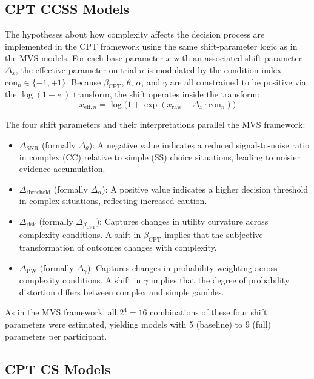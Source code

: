 \documentclass[man,floatsintext]{apa7}
\begin{document}
\subsection{CPT CCSS Models}

The hypotheses about how complexity affects the decision process are implemented in the CPT framework using the same shift-parameter logic as in the MVS models. For each base parameter $x$ with an associated shift parameter $\Delta_x$, the effective parameter on trial $n$ is modulated by the condition index $\text{con}_n \in \{-1, +1\}$. Because $\beta_{\text{CPT}}$, $\theta$, $\alpha$, and $\gamma$ are all constrained to be positive via the $\log(1 + e^{\cdot})$ transform, the shift operates inside the transform:
\begin{equation}
    x_{\text{eff},n} = \log\bigl(1 + \exp(x_{\text{raw}} + \Delta_x \cdot \text{con}_n)\bigr)
    \label{eq:cpt_delta}
\end{equation}

The four shift parameters and their interpretations parallel the MVS framework:
\begin{itemize}
    \item $\Delta_{\text{SNR}}$ (formally $\Delta_\theta$): A negative value indicates a reduced signal-to-noise ratio in complex (CC) relative to simple (SS) choice situations, leading to noisier evidence accumulation.
    \item $\Delta_{\text{threshold}}$ (formally $\Delta_\alpha$): A positive value indicates a higher decision threshold in complex situations, reflecting increased caution.
    \item $\Delta_{\text{risk}}$ (formally $\Delta_{\beta_{\text{CPT}}}$): Captures changes in utility curvature across complexity conditions. A shift in $\beta_{\text{CPT}}$ implies that the subjective transformation of outcomes changes with complexity.
    \item $\Delta_{\text{PW}}$ (formally $\Delta_\gamma$): Captures changes in probability weighting across complexity conditions. A shift in $\gamma$ implies that the degree of probability distortion differs between complex and simple gambles.
\end{itemize}

As in the MVS framework, all $2^4 = 16$ combinations of these four shift parameters were estimated, yielding models with 5 (baseline) to 9 (full) parameters per participant.

\subsection{CPT CS Models}
\end{document}
